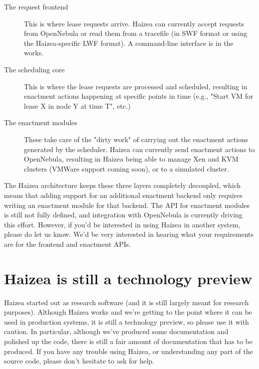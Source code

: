 \begin{description}
\item[The request frontend] This is where lease requests arrive. Haizea can currently accept requests from OpenNebula or read them from a tracefile (in SWF format or using the Haizea-specific LWF format). A command-line interface is in the works.
\item[The scheduling core] This is where the lease requests are processed and scheduled, resulting in enactment actions happening at specific points in time (e.g., "Start VM for lease X in node Y at time T", etc.)
\item[The enactment modules] These take care of the "dirty work" of carrying out the enactment actions generated by the scheduler. Haizea can currently send enactment actions to OpenNebula, resulting in Haizea being able to manage Xen and KVM clusters (VMWare support coming soon), or to a simulated cluster.
\end{description}
The Haizea architecture keeps these three layers completely decoupled, which means that adding support for an additional enactment backend only requires writing an enactment module for that backend. The API for enactment modules is still not fully defined, and integration with OpenNebula is currently driving this effort. However, if you'd be interested in using Haizea in another system, please do let us know. We'd be very interested in hearing what your requirements are for the frontend and enactment APIs.

\section{Haizea is still a technology preview}

Haizea started out as research software (and it is still largely meant for research purposes). Although Haizea works and we're getting to the point where it can be used in production systems, it is still a technology preview, so please use it with caution. In particular, although we've produced some documentation and polished up the code, there is still a fair amount of documentation that has to be produced. If you have any trouble using Haizea, or understanding any part of the source code, please don't hesitate to ask for help.